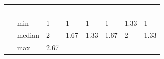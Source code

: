 \documentclass[
  english,
  man,floatsintext]{apa6}
\begin{document}
\begin{longtable}[]{@{}lllllll@{}}
\begin{minipage}[t]{0.11\columnwidth}
~~\strut
\end{minipage}\tabularnewline
\begin{minipage}[t]{0.14\columnwidth}\raggedright
~~ min\strut
\end{minipage} & \begin{minipage}[t]{0.11\columnwidth}\raggedright
1\strut
\end{minipage} & \begin{minipage}[t]{0.12\columnwidth}\raggedright
1\strut
\end{minipage} & \begin{minipage}[t]{0.10\columnwidth}\raggedright
1\strut
\end{minipage} & \begin{minipage}[t]{0.12\columnwidth}\raggedright
1\strut
\end{minipage} & \begin{minipage}[t]{0.10\columnwidth}\raggedright
1.33\strut
\end{minipage} & \begin{minipage}[t]{0.11\columnwidth}\raggedright
1\strut
\end{minipage}\tabularnewline
\begin{minipage}[t]{0.14\columnwidth}\raggedright
~~ median\strut
\end{minipage} & \begin{minipage}[t]{0.11\columnwidth}\raggedright
2\strut
\end{minipage} & \begin{minipage}[t]{0.12\columnwidth}\raggedright
1.67\strut
\end{minipage} & \begin{minipage}[t]{0.10\columnwidth}\raggedright
1.33\strut
\end{minipage} & \begin{minipage}[t]{0.12\columnwidth}\raggedright
1.67\strut
\end{minipage} & \begin{minipage}[t]{0.10\columnwidth}\raggedright
2\strut
\end{minipage} & \begin{minipage}[t]{0.11\columnwidth}\raggedright
1.33\strut
\end{minipage}\tabularnewline
\begin{minipage}[t]{0.14\columnwidth}\raggedright
~~ max\strut
\end{minipage} & \begin{minipage}[t]{0.11\columnwidth}\raggedright
2.67\strut
\end{minipage} & \begin{minipage}[t]{0.12\columnwidth}\raggedright

\end{minipage}
\end{longtable}
\end{document}
